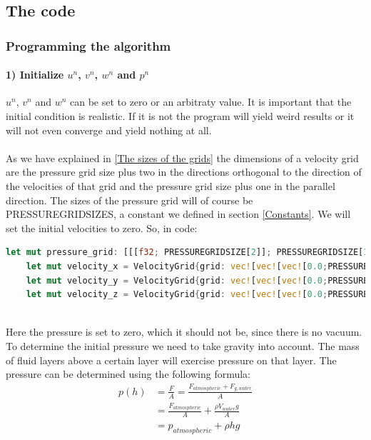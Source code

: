\documentclass{article}
\begin{document}
\subsection{The code}
\subsubsection{Programming the algorithm}
\paragraph{1) Initialize \(u^n\), \(v^n\), \(w^n\) and \(p^n\)}
\(u^n\), \(v^n\) and \(w^n\) can be set to zero or an arbitraty value. It is important that the initial condition is realistic. If it is not the program will yield weird results or it will not even converge and yield nothing at all.
\\ \\
As we have explained in \ref{The sizes of the grids} the dimensions of a velocity grid are the pressure grid size plus two in the directions orthogonal to the direction of the velocities of that grid and the pressure grid size plus one in the parallel direction. The sizes of the pressure grid will of course be PRESSUREGRIDSIZES, a constant we defined in section \ref{Constants}. We will set the initial velocities to zero. So, in code:
\begin{lstlisting}[language=Rust, style=boxed, breaklines=true]
let mut pressure_grid: [[[f32; PRESSUREGRIDSIZE[2]]; PRESSUREGRIDSIZE[1]]; PRESSUREGRIDSIZE[0]]=[[[0.0; PRESSUREGRIDSIZE[2]]; PRESSUREGRIDSIZE[1]]; PRESSUREGRIDSIZE[0]];//pressureGrid[x][y][z] is the pressure at coordinates (x,y,z)
    let mut velocity_x = VelocityGrid{grid: vec![vec![vec![0.0;PRESSUREGRIDSIZE[2]+2]; PRESSUREGRIDSIZE[1]+2]; PRESSUREGRIDSIZE[0]+1], dimension:0};// z,y,x !!!
    let mut velocity_y = VelocityGrid{grid: vec![vec![vec![0.0;PRESSUREGRIDSIZE[2]+2]; PRESSUREGRIDSIZE[1]+1]; PRESSUREGRIDSIZE[0]+2], dimension:1}; 
    let mut velocity_z = VelocityGrid{grid: vec![vec![vec![0.0;PRESSUREGRIDSIZE[2]+1]; PRESSUREGRIDSIZE[1]+2]; PRESSUREGRIDSIZE[0]+2], dimension:2}; 
    
\end{lstlisting}
Here the pressure is set to zero, which it should not be, since there is no vacuum. To determine the initial pressure we need to take gravity into account. The mass of fluid layers above a certain layer will exercise pressure on that layer. The pressure can be determined using the following formula:
\[
\begin{split}
p(h)&=\frac{F}{A}=\frac{F_{atmospheric}+F_{g,water}}{A}
\\&=\frac{F_{atmospheric}}{A}+\frac{\rho V_{water}g}{A}
\\&=p_{atmospheric}+\rho hg
\end{split}
\]
\end{document}
